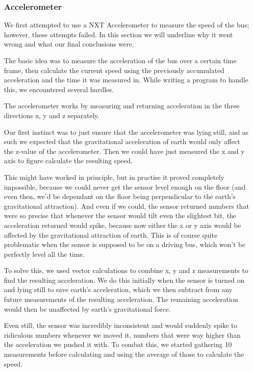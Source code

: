 
\subsubsection{Accelerometer}

We first attempted to use a NXT Accelerometer to measure the speed of the bus; however, these attempts failed. In this section we will underline why it went wrong and what our final conclusions were. 

The basic idea was to measure the acceleration of the bus over a certain time frame, then calculate the current speed using the previously accumulated acceleration and the time it was measured in. While writing a program to handle this, we encountered several hurdles. 

The accelerometer works by measuring and returning acceleration in the three directions x, y and z separately.  

Our first instinct was to just ensure that the accelerometer was lying still, and as such we expected that the gravitational acceleration of earth would only affect the z-value of the accelerometer. Then we could have just measured the x and y axis to figure calculate the resulting speed. 

This might have worked in principle, but in practise it proved completely impossible, because we could never get the sensor level enough on the floor (and even then, we'd be dependant on the floor being perpendicular to the earth's gravitational attraction). And even if we could, the sensor returned numbers that were so precise that whenever the sensor would tilt even the slightest bit, the acceleration returned would spike, because now either the x or y axis would be affected by the gravitational attraction of earth. This is of course quite problematic when the sensor is supposed to be on a driving bus, which won't be perfectly level all the time. 

To solve this, we used vector calculations to combine x, y and z measurements to find the resulting acceleration. We do this initially when the sensor is turned on and lying still to save earth's acceleration, which we then subtract from any future measurements of the resulting acceleration. The remaining acceleration would then be unaffected by earth's gravitational force. 

Even still, the sensor was incredibly inconsistent and would suddenly spike to ridiculous numbers whenever we moved it, numbers that were way higher than the acceleration we pushed it with. To combat this, we started gathering 10 measurements before calculating and using the average of those to calculate the speed.

